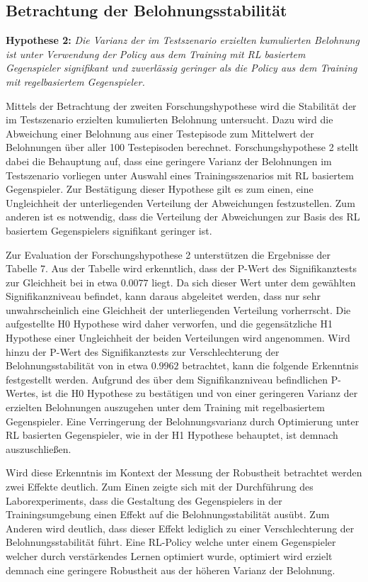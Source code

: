 \subsection{Betrachtung der Belohnungsstabilität}

\textbf{Hypothese 2:}
\textit{Die Varianz der im Testszenario erzielten kumulierten Belohnung ist unter Verwendung der Policy aus dem Training mit RL basiertem Gegenspieler signifikant und zuverlässig geringer als die Policy aus dem Training mit regelbasiertem Gegenspieler.}

Mittels der Betrachtung der zweiten Forschungshypothese wird die Stabilität der im Testszenario erzielten kumulierten Belohnung untersucht.
Dazu wird die Abweichung einer Belohnung aus einer Testepisode zum Mittelwert der Belohnungen über aller 100 Testepisoden berechnet.
Forschungshypothese 2 stellt dabei die Behauptung auf, dass eine geringere Varianz der Belohnungen im Testszenario vorliegen unter Auswahl eines Trainingsszenarios mit RL basiertem Gegenspieler.
Zur Bestätigung dieser Hypothese gilt es zum einen, eine Ungleichheit der unterliegenden Verteilung der Abweichungen festzustellen.
Zum anderen ist es notwendig, dass die Verteilung der Abweichungen zur Basis des RL basiertem Gegenspielers signifikant geringer ist.

Zur Evaluation der Forschungshypothese 2 unterstützen die Ergebnisse der Tabelle 7.
Aus der Tabelle wird erkenntlich, dass der P-Wert des Signifikanztests zur Gleichheit bei in etwa $0.0077$ liegt.
Da sich dieser Wert unter dem gewählten Signifikanzniveau befindet, kann daraus abgeleitet werden, dass nur sehr unwahrscheinlich eine Gleichheit der unterliegenden Verteilung vorherrscht.
Die aufgestellte H0 Hypothese wird daher verworfen, und die gegensätzliche H1 Hypothese einer Ungleichheit der beiden Verteilungen wird angenommen.
Wird hinzu der P-Wert des Signifikanztests zur Verschlechterung der Belohnungsstabilität von in etwa $0.9962$ betrachtet, kann die folgende Erkenntnis festgestellt werden.
Aufgrund des über dem Signifikanzniveau befindlichen P-Wertes, ist die H0 Hypothese zu bestätigen und von einer geringeren Varianz der erzielten Belohnungen auszugehen unter dem Training mit regelbasiertem Gegenspieler.
Eine Verringerung der Belohnungsvarianz durch Optimierung unter RL basierten Gegenspieler, wie in der H1 Hypothese behauptet, ist demnach auszuschließen.

Wird diese Erkenntnis im Kontext der Messung der Robustheit betrachtet werden zwei Effekte deutlich.
Zum Einen zeigte sich mit der Durchführung des Laborexperiments, dass die Gestaltung des Gegenspielers in der Trainingsumgebung einen Effekt auf die Belohnungsstabilität ausübt.
Zum Anderen wird deutlich, dass dieser Effekt lediglich zu einer Verschlechterung der Belohnungsstabilität führt.
Eine RL-Policy welche unter einem Gegenspieler welcher durch verstärkendes Lernen optimiert wurde, optimiert wird erzielt demnach eine geringere Robustheit aus der höheren Varianz der Belohnung.

